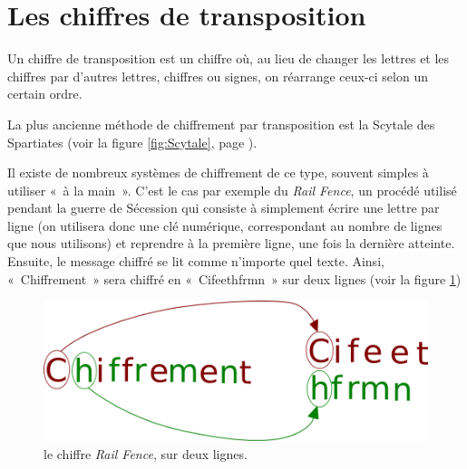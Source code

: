 \section{Les chiffres de transposition\label{sec:Transposition}}
Un chiffre de transposition est un chiffre où, au lieu de changer
les lettres et les chiffres par d'autres lettres, chiffres ou signes,
on réarrange ceux-ci selon un certain ordre.

La plus ancienne méthode de chiffrement par transposition est la
Scytale des Spartiates (voir la figure \ref{fig:Scytale}, page
\pageref{fig:Scytale}).

Il existe de nombreux systèmes de chiffrement de ce type, souvent
simples à utiliser «~à la main~». C'est le cas par exemple du
\emph{Rail Fence}, un procédé utilisé pendant la guerre de Sécession
qui consiste à simplement écrire une lettre par ligne (on utilisera donc
une clé numérique, correspondant au nombre de lignes que nous utilisons) et
reprendre à la première ligne, une fois la dernière atteinte. Ensuite,
le message chiffré se lit comme n'importe quel texte.
Ainsi, «~Chiffrement~» sera chiffré en «~Cifeethfrmn~» sur deux
lignes (voir la figure \ref{fig:Transposition})
\begin{figure}[h]
  \begin{center}
    \includegraphics[scale=0.4]{images/Transposition.png}
  \end{center}
  \caption{le chiffre \emph{Rail Fence}, sur deux lignes.}
  \label{fig:Transposition}
\end{figure}

